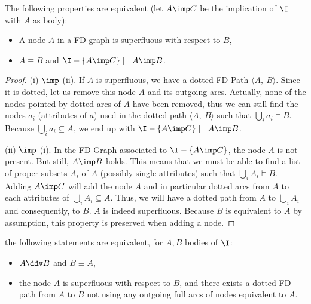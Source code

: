 \begin{proposition} \label{prop:maier.equiv_sup_sub} The following properties
are equivalent (let $A \imp C$ be the implication of $\I$ with $A$ as body):
\begin{itemize}
	\item[(i)] A node $A$ in a FD-graph is superfluous with respect to $B$,
	\item[(ii)] $A \equiv B$ and $\I - \{A \imp C \} \models A \imp B$.
\end{itemize}
\end{proposition}

\begin{proof} (i) $\imp$ (ii). If $A$ is superfluous, we have a dotted FD-Path
$\langle A, \ B \rangle$. Since it is dotted, let us remove this node $A$ 
and its outgoing arcs. Actually, none of the nodes pointed by dotted arcs of $A$
have been removed, thus we can still find the nodes $a_i$ (attributes of 
$a$) used in the dotted path $\langle A, \ B \rangle$ such that $\bigcup_i a_i 
\models B$. Because $\bigcup_i a_i \subseteq A$, we end up with $\I - \{A 
\imp C \} \models A \imp B$.

\vspace{1.2em}

(ii) $\imp$ (i). In the FD-Graph associated to $\I - \{A \imp C \}$, the 
node $A$ is not present. But still, $A \imp B$ holds. This means that we must be
able to find a list of proper subsets $A_i$ of $A$ (possibly single 
attributes) such that $\bigcup_{i} A_i \models B$. Adding $A \imp C$ will add the node $A$ and in particular dotted arcs from $A$ to each attributes of $\bigcup_{i} A_i \subseteq A$. Thus, we will have a dotted path from $A$ to $\bigcup_{i} A_i$ and consequently, to $B$. $A$ is indeed superfluous. Because $B$ is equivalent to $A$ by assumption, this property is preserved when adding a node.
	
\end{proof}


\begin{proposition} \label{prop:maier.equiv_ssup_dd}
the following statements are equivalent, for $A, B$ bodies of $\I$:
\begin{itemize}
	\item[(i)] $A \ddv B$ and $B \equiv A$,
	\item[(ii)] the node $A$ is superfluous with respect to $B$, and there 
	exists 
	a dotted FD-path from $A$ to $B$ not using any outgoing full arcs of
	nodes equivalent to $A$.
\end{itemize}
	
\end{proposition}


